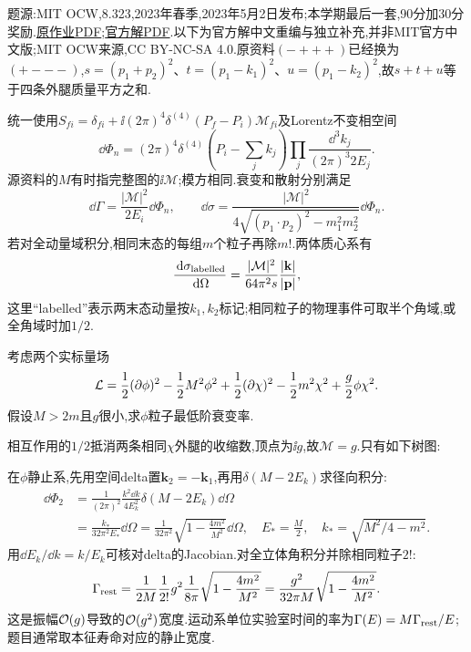 题源:MIT OCW,8.323,2023年春季,2023年5月2日发布;本学期最后一套,90分加30分奖励.\href{https://ocw.mit.edu/courses/8-323-relativistic-quantum-field-theory-i-spring-2023/mit8_323_s23_pset12.pdf}{原作业PDF};\href{https://ocw.mit.edu/courses/8-323-relativistic-quantum-field-theory-i-spring-2023/mit8_323_s23_pset_12sol.pdf}{官方解PDF}.以下为官方解中文重编与独立补充,并非MIT官方中文版;MIT OCW来源,CC BY-NC-SA 4.0.原资料$(-+++)$已经换为$(+---)$,$s=(p_1+p_2)^2$、$t=(p_1-k_1)^2$、$u=(p_1-k_2)^2$,故$s+t+u$等于四条外腿质量平方之和.

统一使用$S_{fi}=\delta_{fi}+\ii(2\pi)^4\delta^{(4)}(P_f-P_i)\mathcal M_{fi}$及Lorentz不变相空间
\[
 \dd\Phi_n=(2\pi)^4\delta^{(4)}(P_i-\textstyle\sum_jk_j)
 \prod_j\frac{\dd^3k_j}{(2\pi)^3 2E_j}.
\]
源资料的$M$有时指完整图的$\ii\mathcal M$;模方相同.衰变和散射分别满足\[\dd\Gamma=\frac{|\mathcal M|^2}{2E_i}\dd\Phi_n,\qquad\dd\sigma=\frac{|\mathcal M|^2}{4\sqrt{(p_1\cdot p_2)^2-m_1^2m_2^2}}\dd\Phi_n.\]若对全动量域积分,相同末态的每组$m$个粒子再除$m!$.两体质心系有
\[
 \frac{\,\mathrm d\sigma_{\rm labelled}}{\,\mathrm d\Omega}=\frac{|\mathcal M|^2}{64\pi^2s}\frac{|\mathbf k|}{|\mathbf p|},
\]
这里“labelled”表示两末态动量按$k_1,k_2$标记;相同粒子的物理事件可取半个角域,或全角域时加$1/2$.

\begin{exercise}
考虑两个实标量场
\[
 \mathcal L=\frac12(\partial\phi)^2-\frac12M^2\phi^2
 +\frac12(\partial\chi)^2-\frac12m^2\chi^2+\frac g2\phi\chi^2.
\]
假设$M>2m$且$g$很小,求$\phi$粒子最低阶衰变率.
\end{exercise}
\begin{solution}
相互作用的$1/2$抵消两条相同$\chi$外腿的收缩数,顶点为$\ii g$,故$\mathcal M=g$.只有如下树图:
\begin{center}\end{center}
在$\phi$静止系,先用空间delta置$\mathbf k_2=-\mathbf k_1$,再用$\delta(M-2E_k)$求径向积分:
\begin{align*}
 \dd\Phi_2&=\frac1{(2\pi)^2}\frac{k^2\dd k}{4E_k^2}\delta(M-2E_k)\dd\Omega\\
 &=\frac{k_*}{32\pi^2E_*}\dd\Omega
 =\frac1{32\pi^2}\sqrt{1-\frac{4m^2}{M^2}}\dd\Omega,
 \quad E_*=\frac M2,\quad k_*=\sqrt{M^2/4-m^2}.
\end{align*}
用$\dd E_k/\dd k=k/E_k$可核对delta的Jacobian.对全立体角积分并除相同粒子$2!$:
\[
 \Gamma_{\rm rest}=\frac1{2M}\frac1{2!}g^2\frac1{8\pi}
 \sqrt{1-\frac{4m^2}{M^2}}
 =\frac{g^2}{32\pi M}\sqrt{1-\frac{4m^2}{M^2}}.
\]
这是振幅$\mathcal O(g)$导致的$\mathcal O(g^2)$宽度.运动系单位实验室时间的率为$\Gamma(E)=M\Gamma_{\rm rest}/E$;题目通常取本征寿命对应的静止宽度.
\end{solution}


